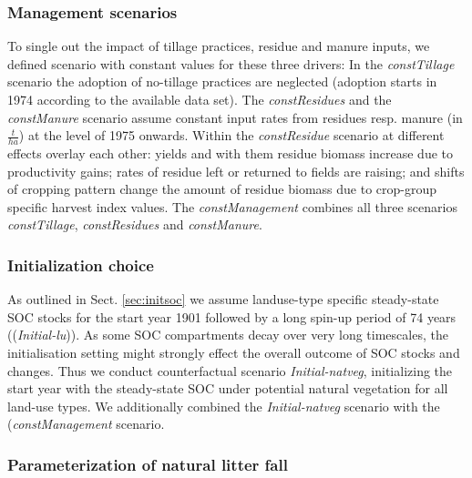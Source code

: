 \documentclass[gc, manuscript]{copernicus}
\begin{document}
\hypertarget{sec:scen_management}{%
\subsubsection{Management scenarios}\label{sec:scen_management}}

To single out the impact of tillage practices, residue and manure inputs, we defined scenario with constant values for these three drivers: In the \textit{constTillage} scenario the adoption of no-tillage practices are neglected (adoption starts in 1974 according to the available data set). The \textit{constResidues} and the \textit{constManure} scenario assume constant input rates from residues resp. manure (in \(\tfrac{t}{ha}\)) at the level of 1975 onwards. Within the \textit{constResidue} scenario at different effects overlay each other: yields and with them residue biomass increase due to productivity gains; rates of residue left or returned to fields are raising; and shifts of cropping pattern change the amount of residue biomass due to crop-group specific harvest index values. The \textit{constManagement} combines all three scenarios \textit{constTillage}, \textit{constResidues} and \textit{constManure}.

\hypertarget{sec:scen_initial}{%
\subsubsection{Initialization choice}\label{sec:scen_initial}}

As outlined in Sect. \ref{sec:initsoc} we assume landuse-type specific steady-state SOC stocks for the start year 1901 followed by a long spin-up period of 74 years ((\textit{Initial-lu})). As some SOC compartments decay over very long timescales, the initialisation setting might strongly effect the overall outcome of SOC stocks and changes. Thus we conduct counterfactual scenario \textit{Initial-natveg}, initializing the start year with the steady-state SOC under potential natural vegetation for all land-use types. We additionally combined the \textit{Initial-natveg} scenario with the (\textit{constManagement} scenario.

\hypertarget{sec:scenlitterpnv}{%
\subsubsection{Parameterization of natural litter fall}\label{sec:scenlitterpnv}}
\end{document}
